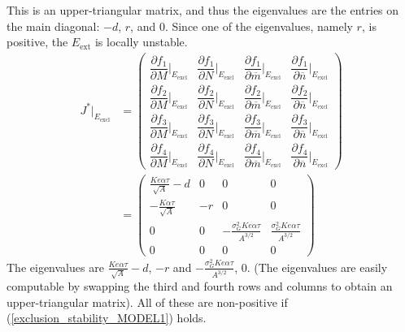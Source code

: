 \documentclass{amsart}
\theoremstyle{definition}
\theoremstyle{remark}
\numberwithin{equation}{section}
\begin{document}
This is an upper-triangular matrix, and thus the eigenvalues are the entries on the main diagonal: $-d$, $r$, and $0$.  Since one of the eigenvalues, namely $r$, is positive, the $E_{\text{ext}}$ is locally unstable.
\begin{align*}
	J^*|_{E_{\text{excl}}} &= \left(\begin{array}{cccc}
		\dfrac{\partial f_1}{\partial M}\Big|_{E_{\text{excl}}} & \dfrac{\partial f_1}{\partial N}\Big|_{E_{\text{excl}}} & \dfrac{\partial f_1}{\partial \overline{m}}\Big|_{E_{\text{excl}}} & \dfrac{\partial f_1}{\partial \overline{n}}\Big|_{E_{\text{excl}}} \\[10px]
		\dfrac{\partial f_2}{\partial M}\Big|_{E_{\text{excl}}} & \dfrac{\partial f_2}{\partial N}\Big|_{E_{\text{excl}}} & \dfrac{\partial f_2}{\partial \overline{m}}\Big|_{E_{\text{excl}}} & \dfrac{\partial f_2}{\partial \overline{n}}\Big|_{E_{\text{excl}}} \\[10px]
		\dfrac{\partial f_3}{\partial M}\Big|_{E_{\text{excl}}} & \dfrac{\partial f_3}{\partial N}\Big|_{E_{\text{excl}}} & \dfrac{\partial f_3}{\partial \overline{m}}\Big|_{E_{\text{excl}}} & \dfrac{\partial f_3}{\partial \overline{n}}\Big|_{E_{\text{excl}}} \\[10px]
		\dfrac{\partial f_4}{\partial M}\Big|_{E_{\text{excl}}} & \dfrac{\partial f_4}{\partial N}\Big|_{E_{\text{excl}}} & \dfrac{\partial f_4}{\partial \overline{m}}\Big|_{E_{\text{excl}}} & \dfrac{\partial f_4}{\partial \overline{n}}\Big|_{E_{\text{excl}}}
	\end{array}\right) \\
	&= \left(\begin{array}{cccc}
		\frac{Ke\alpha\tau}{\sqrt{A}} - d & 0 & 0 & 0 \\
		-\frac{K\alpha\tau}{\sqrt{A}} & -r & 0 & 0 \\
		0 & 0 & -\frac{\sigma_G^2Ke\alpha\tau}{A^{3/2}} & \frac{\sigma_G^2Ke\alpha\tau}{A^{3/2}} \\
		0 & 0 & 0 & 0
	\end{array}\right)
\end{align*}
The eigenvalues are $\frac{Ke\alpha\tau}{\sqrt{A}} - d$, $-r$ and $-\frac{\sigma_G^2Ke\alpha\tau}{A^{3/2}}$, $0$.  (The eigenvalues are easily computable by swapping the third and fourth rows and columns to obtain an upper-triangular matrix).  All of these are non-positive if (\ref{exclusion_stability_MODEL1}) holds.
\end{document}
